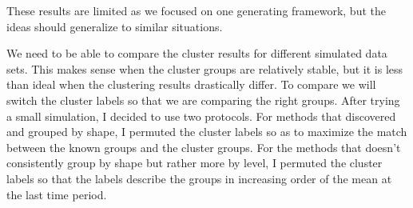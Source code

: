 \documentclass[12pt]{article}
\begin{document}
These results are limited as we focused on one generating framework, but the ideas should generalize to similar situations.




We need to be able to compare the cluster results for different simulated data sets. This makes sense when the cluster groups are relatively stable, but it is less than ideal when the clustering results drastically differ. To compare we will switch the cluster labels so that we are comparing the right groups. After trying a small simulation, I decided to use two protocols. For methods that discovered and grouped by shape, I permuted the cluster labels so as to maximize the match between the known groups and the cluster groups. For the methods that doesn't consistently group by shape but rather more by level, I permuted the cluster labels so that the labels describe the groups in increasing order of the mean at the last time period. 
\end{document}

